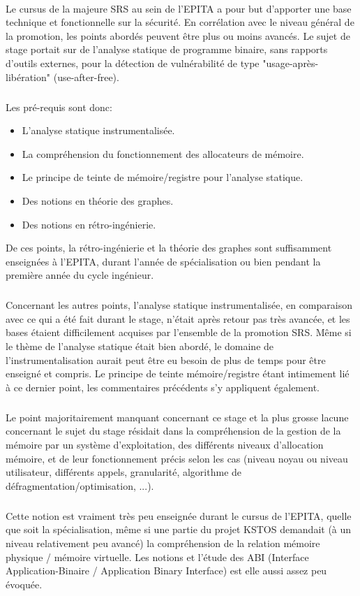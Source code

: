 \paragraph{}
Le cursus de la majeure SRS au sein de l'EPITA a pour but d'apporter une base technique et fonctionnelle
sur la sécurité. En corrélation avec le niveau général de la promotion, les points abordés peuvent être
plus ou moins avancés. Le sujet de stage portait sur de l'analyse statique de programme binaire, sans rapports
d'outils externes, pour la détection de vulnérabilité de type "usage-après-libération" (use-after-free).
\subparagraph{}
Les pré-requis sont donc:
\begin{itemize}
\item L'analyse statique instrumentalisée.
\item La compréhension du fonctionnement des allocateurs de mémoire.
\item Le principe de teinte de mémoire/registre pour l'analyse statique.
\item Des notions en théorie des graphes.
\item Des notions en rétro-ingénierie.
\end{itemize}

De ces points, la rétro-ingénierie et la théorie des graphes sont suffisamment enseignées à l'EPITA,
durant l'année de spécialisation ou bien pendant la première année du cycle ingénieur.
\subparagraph{}
Concernant les autres points, l'analyse statique instrumentalisée, en comparaison avec ce qui a été
fait durant le stage, n'était après retour pas très avancée, et les bases étaient difficilement acquises par
l'ensemble de la promotion SRS. Même si le thème de l'analyse statique était bien abordé, le domaine de l'instrumentalisation
aurait peut être eu besoin de plus de temps pour être enseigné et compris. Le principe de teinte mémoire/registre étant intimement
lié à ce dernier point, les commentaires précédents s'y appliquent également.
\subparagraph{}
Le point majoritairement manquant concernant ce stage et la plus grosse lacune concernant le sujet du stage résidait dans la compréhension de
la gestion de la mémoire par un système d'exploitation, des différents niveaux d'allocation mémoire, et de leur fonctionnement précis
selon les cas (niveau noyau ou niveau utilisateur, différents appels, granularité, algorithme de défragmentation/optimisation, ...).
\subparagraph{}
Cette notion est vraiment très peu enseignée durant le cursus de l'EPITA, quelle que soit la spécialisation, même si une partie du projet KSTOS
demandait (à un niveau relativement peu avancé) la compréhension de la relation mémoire physique / mémoire virtuelle.
Les notions et l'étude des ABI (Interface Application-Binaire / Application Binary Interface) est elle aussi assez peu évoquée.
\subparagraph{}

